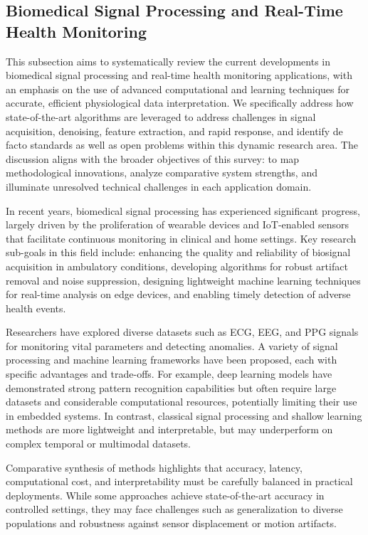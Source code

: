 \documentclass[sigconf]{acmart}
\begin{document}
\subsection{Biomedical Signal Processing and Real-Time Health Monitoring}

This subsection aims to systematically review the current developments in biomedical signal processing and real-time health monitoring applications, with an emphasis on the use of advanced computational and learning techniques for accurate, efficient physiological data interpretation. We specifically address how state-of-the-art algorithms are leveraged to address challenges in signal acquisition, denoising, feature extraction, and rapid response, and identify de facto standards as well as open problems within this dynamic research area. The discussion aligns with the broader objectives of this survey: to map methodological innovations, analyze comparative system strengths, and illuminate unresolved technical challenges in each application domain.

In recent years, biomedical signal processing has experienced significant progress, largely driven by the proliferation of wearable devices and IoT-enabled sensors that facilitate continuous monitoring in clinical and home settings. Key research sub-goals in this field include: enhancing the quality and reliability of biosignal acquisition in ambulatory conditions, developing algorithms for robust artifact removal and noise suppression, designing lightweight machine learning techniques for real-time analysis on edge devices, and enabling timely detection of adverse health events.

Researchers have explored diverse datasets such as ECG, EEG, and PPG signals for monitoring vital parameters and detecting anomalies. A variety of signal processing and machine learning frameworks have been proposed, each with specific advantages and trade-offs. For example, deep learning models have demonstrated strong pattern recognition capabilities but often require large datasets and considerable computational resources, potentially limiting their use in embedded systems. In contrast, classical signal processing and shallow learning methods are more lightweight and interpretable, but may underperform on complex temporal or multimodal datasets.

Comparative synthesis of methods highlights that accuracy, latency, computational cost, and interpretability must be carefully balanced in practical deployments. While some approaches achieve state-of-the-art accuracy in controlled settings, they may face challenges such as generalization to diverse populations and robustness against sensor displacement or motion artifacts.
\end{document}
